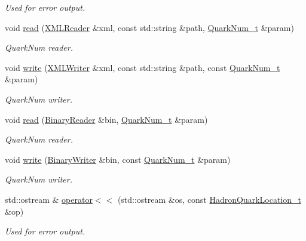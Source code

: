 \begin{DoxyCompactItemize}
\begin{DoxyCompactList}\small\item\em Used for error output. \end{DoxyCompactList}\item 
void \mbox{\hyperlink{namespaceHadron_a9fc0b61edf5216d1720dabf68810d3b5}{read}} (\mbox{\hyperlink{classADATXML_1_1XMLReader}{X\+M\+L\+Reader}} \&xml, const std\+::string \&path, \mbox{\hyperlink{structHadron_1_1QuarkNum__t}{Quark\+Num\+\_\+t}} \&param)
\begin{DoxyCompactList}\small\item\em Quark\+Num reader. \end{DoxyCompactList}\item 
void \mbox{\hyperlink{namespaceHadron_a7da51caa70247c9ab9d11f8275ec93b7}{write}} (\mbox{\hyperlink{classADATXML_1_1XMLWriter}{X\+M\+L\+Writer}} \&xml, const std\+::string \&path, const \mbox{\hyperlink{structHadron_1_1QuarkNum__t}{Quark\+Num\+\_\+t}} \&param)
\begin{DoxyCompactList}\small\item\em Quark\+Num writer. \end{DoxyCompactList}\item 
void \mbox{\hyperlink{namespaceHadron_a1f04a3926b07155fbf7e7887169d7f4e}{read}} (\mbox{\hyperlink{classADATIO_1_1BinaryReader}{Binary\+Reader}} \&bin, \mbox{\hyperlink{structHadron_1_1QuarkNum__t}{Quark\+Num\+\_\+t}} \&param)
\begin{DoxyCompactList}\small\item\em Quark\+Num reader. \end{DoxyCompactList}\item 
void \mbox{\hyperlink{namespaceHadron_a44eb64f50cbbc947364a538026c97ee6}{write}} (\mbox{\hyperlink{classADATIO_1_1BinaryWriter}{Binary\+Writer}} \&bin, const \mbox{\hyperlink{structHadron_1_1QuarkNum__t}{Quark\+Num\+\_\+t}} \&param)
\begin{DoxyCompactList}\small\item\em Quark\+Num writer. \end{DoxyCompactList}\item 
std\+::ostream \& \mbox{\hyperlink{namespaceHadron_a16e2cbe171cccf191439c38f7ce36655}{operator$<$$<$}} (std\+::ostream \&os, const \mbox{\hyperlink{structHadron_1_1HadronQuarkLocation__t}{Hadron\+Quark\+Location\+\_\+t}} \&op)
\begin{DoxyCompactList}\small\item\em Used for error output. \end{DoxyCompactList}\item 

\end{DoxyCompactItemize}
